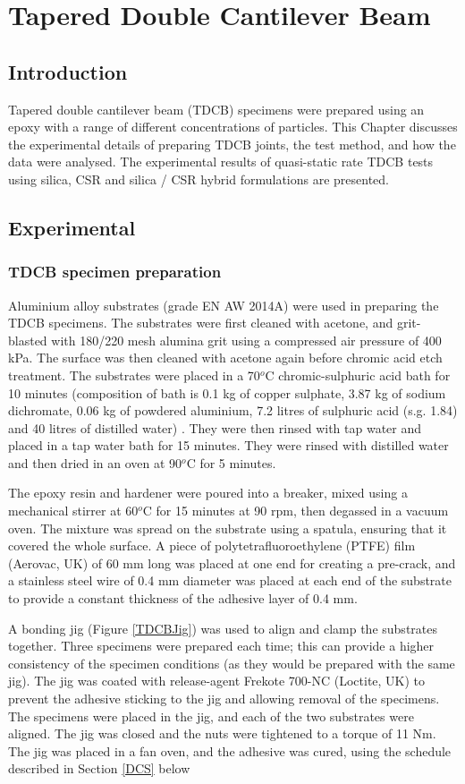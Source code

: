 \documentclass[numbers=noendperiod,chapterprefix=on]{icldt} %
\begin{document}
\chapter{Tapered Double Cantilever Beam}
\section{Introduction}
Tapered double cantilever beam (TDCB) specimens were prepared using an epoxy with a range of different concentrations of particles. This Chapter discusses the experimental details of preparing TDCB joints, the test method, and how the data were analysed. The experimental results of quasi-static rate TDCB tests using silica, CSR and silica / CSR hybrid formulations are presented.   

\section{Experimental}
\subsection{TDCB specimen preparation}
Aluminium alloy substrates (grade EN AW 2014A) were used in preparing the TDCB specimens. The substrates were first cleaned with acetone, and grit-blasted with 180/220 mesh alumina grit using a compressed air pressure of 400 kPa. The surface was then cleaned with acetone again before chromic acid etch treatment. The substrates were placed in a 70$^o$C chromic-sulphuric acid bath for 10 minutes (composition of bath is 0.1 kg of copper sulphate, 3.87 kg of sodium dichromate, 0.06 kg of powdered aluminium, 7.2 litres of sulphuric acid (s.g. 1.84) and 40 litres of distilled water) \cite{Blackman1996a}. They were then rinsed with tap water and placed in a tap water bath for 15 minutes. They were rinsed with distilled water and then dried in an oven at 90$^o$C for 5 minutes.

The epoxy resin and hardener were poured into a breaker, mixed using a mechanical stirrer at 60$^o$C for 15 minutes at 90 rpm, then degassed in a vacuum oven. The mixture was spread on the substrate using a spatula, ensuring that it covered the whole surface. A piece of polytetrafluoroethylene (PTFE) film (Aerovac, UK) of 60 mm long was placed at one end for creating a pre-crack, and a stainless steel wire of 0.4 mm diameter was placed at each end of the substrate to provide a constant thickness of the adhesive layer of 0.4 mm.

A bonding jig (Figure \ref{TDCBJig}) was used to align and clamp the substrates together. Three specimens were prepared each time; this can provide a higher consistency of the specimen conditions (as they would be prepared with the same jig). The jig was coated with release-agent Frekote 700-NC (Loctite, UK) to prevent the adhesive sticking to the jig and allowing removal of the specimens. The specimens were placed in the jig, and each of the two substrates were aligned. The jig was closed and the nuts were tightened to a torque of 11 Nm. 
The jig was placed in a fan oven, and the adhesive was cured, using the schedule described in Section \ref{DCS} below
\end{document}
